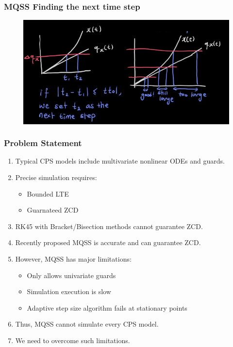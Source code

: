 \begin{frame} \frametitle{MQSS Finding the next time step }
	\centering
	\begin{figure} 
		\includegraphics[width=1\textwidth]{./fig/dq1.png}
	\end{figure}
\end{frame}



\begin{frame} \frametitle{ Problem Statement }
	\begin{enumerate}
		\item Typical CPS models include multivariate nonlinear ODEs and guards.
		\item Precise simulation requires: 
			\begin{itemize}
			\item Bounded LTE
			\item Guarnateed ZCD
			\end{itemize}
		\item RK45 with Bracket/Bisection methods cannot guarantee ZCD.
		\item Recently proposed MQSS is accurate and can guarantee ZCD.
		\item However, MQSS has major limitations:
			\begin{itemize}
				\item Only allows univariate guards
				\item Simulation execution is slow
				\item Adaptive step size algorithm fails at stationary points
			\end{itemize}
		\item Thus, MQSS cannot simulate every CPS model.
		\item We need to overcome such limitations.
	\end{enumerate}
	
\end{frame}

